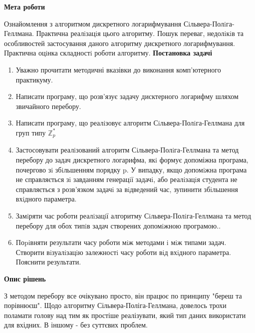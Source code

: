 \documentclass[fontsize=14.4pt]{report}
\begin{document}
\noindent\large\textbf{Мета роботи}\par
Ознайомлення з алгоритмом дискретного логарифмування Сiльвера-Полiга-Геллмана. Практична
реалiзацiя цього алгоритму. Пошук переваг, недолiкiв та особливостей застосування даного алгоритму
дискретного логарифмування. Практична оцiнка складностi роботи алгоритму.\newline
\noindent\large\textbf{Постановка задачі}\par
\begin{enumerate}
    \item Уважно прочитати методичні вказівки до виконання \newline комп’ютерного практикуму.
    \item Написати програму, що розв’язує задачу дисктерного логарифму шляхом звичайного перебору.
    \item Написати програму, що реалiзовує алгоритм Сiльвера-Полiга-Геллмана для груп типу $ \mathbb{Z}_p^* $
    \item Застосовувати реалiзований алгоритм Сiльвера-Полiга-Геллмана та метод перебору до задач дискретного логарифма, якi формує допоміжна програма, почергово зi збiльшенням порядку p. У випадку, якщо допомiжна програма не справляється зi завданням генерацiї задачi, або
    реалiзацiя студента не справляється з розв’язком задачi за вiдведений час, зупинити збiльшення
    вхiдного параметра.
    \item Замiряти час роботи реалiзацiї алгоритму Сiльвера-Полiга-Геллмана та метод перебору для обох
    типiв задач створених допомiжною програмою..
    \item Поpiвняти результати часу роботи мiж методами i мiж типами задач. Створити вiзуалiзацiю
    залежностi часу роботи вiд вхiдного параметра. Пояснити результати.
\end{enumerate}
\newpage

\noindent\large\textbf{Опис рішень}\par
З методом перебору все очікувано просто, він працює по принципу "береш та порівнюєш". Щодо алгоритму Сільвера-Поліга-Геллмана, довелось трохи поламати голову над тим як простіше реалізувати, який тип даних використати для вхідних. В іншому - без суттєвих проблем.
\end{document}

